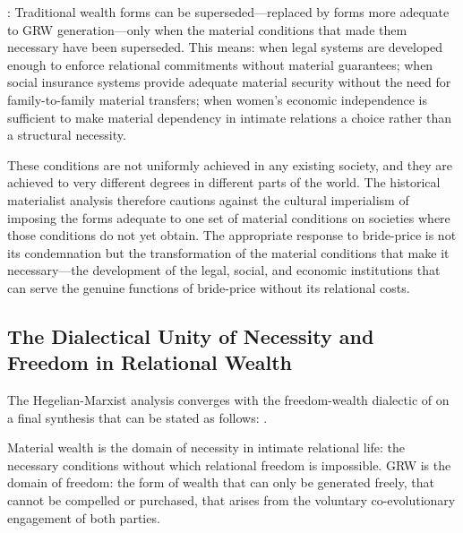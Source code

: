 : Traditional wealth forms can be superseded---replaced by forms more adequate to GRW generation---only when the material conditions that made them necessary have been superseded. This means: when legal systems are developed enough to enforce relational commitments without material guarantees; when social insurance systems provide adequate material security without the need for family-to-family material transfers; when women's economic independence is sufficient to make material dependency in intimate relations a choice rather than a structural necessity.

These conditions are not uniformly achieved in any existing society, and they are achieved to very different degrees in different parts of the world. The historical materialist analysis therefore cautions against the cultural imperialism of imposing the forms adequate to one set of material conditions on societies where those conditions do not yet obtain. The appropriate response to bride-price is not its condemnation but the transformation of the material conditions that make it necessary---the development of the legal, social, and economic institutions that can serve the genuine functions of bride-price without its relational costs.

\subsection{The Dialectical Unity of Necessity and Freedom in Relational Wealth}
\label{p15:subsec:necessity_freedom}

\noindent
The Hegelian-Marxist analysis converges with the freedom-wealth dialectic of  on a final synthesis that can be stated as follows: .

Material wealth is the domain of necessity in intimate relational life: the necessary conditions without which relational freedom is impossible. GRW is the domain of freedom: the form of wealth that can only be generated freely, that cannot be compelled or purchased, that arises from the voluntary co-evolutionary engagement of both parties.

